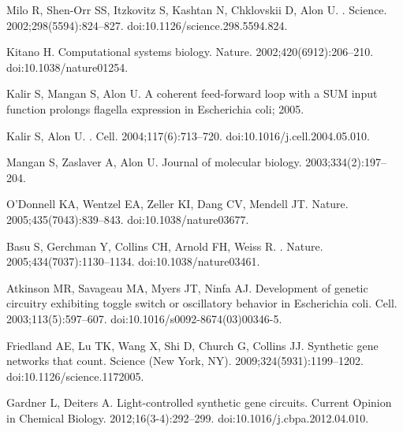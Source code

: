 \documentclass[10pt,letterpaper]{article}
\begin{document}
\begin{thebibliography}{10}
Milo R, Shen-Orr SS, Itzkovitz S, Kashtan N, Chklovskii D, Alon U.
.
\newblock Science. 2002;298(5594):824--827.
\newblock doi:{10.1126/science.298.5594.824}.

Kitano H.
\newblock Computational systems biology.
\newblock Nature. 2002;420(6912):206--210.
\newblock doi:{10.1038/nature01254}.

Kalir S, Mangan S, Alon U. {A coherent feed-forward loop with a SUM input
  function prolongs flagella expression in Escherichia coli}; 2005.

Kalir S, Alon U.
.
\newblock Cell. 2004;117(6):713--720.
\newblock doi:{10.1016/j.cell.2004.05.010}.

Mangan S, Zaslaver A, Alon U.
\newblock Journal of molecular biology. 2003;334(2):197--204.

O'Donnell KA, Wentzel EA, Zeller KI, Dang CV, Mendell JT.
\newblock Nature. 2005;435(7043):839--843.
\newblock doi:{10.1038/nature03677}.

Basu S, Gerchman Y, Collins CH, Arnold FH, Weiss R.
.
\newblock Nature. 2005;434(7037):1130--1134.
\newblock doi:{10.1038/nature03461}.

Atkinson MR, Savageau MA, Myers JT, Ninfa AJ.
\newblock Development of genetic circuitry exhibiting toggle switch or
  oscillatory behavior in {Escherichia} coli.
\newblock Cell. 2003;113(5):597--607.
\newblock doi:{10.1016/s0092-8674(03)00346-5}.

Friedland AE, Lu TK, Wang X, Shi D, Church G, Collins JJ.
\newblock Synthetic gene networks that count.
\newblock Science (New York, NY). 2009;324(5931):1199--1202.
\newblock doi:{10.1126/science.1172005}.

Gardner L, Deiters A.
\newblock Light-controlled synthetic gene circuits.
\newblock Current Opinion in Chemical Biology. 2012;16(3-4):292--299.
\newblock doi:{10.1016/j.cbpa.2012.04.010}.


\end{thebibliography}
\end{document}
